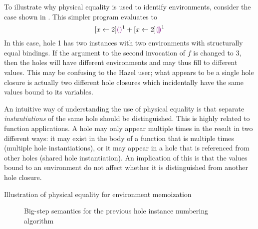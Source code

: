 To illustrate why physical equality is used to identify environments, consider the case shown in . This simpler program evaluates to \[
  [x\leftarrow 2]\textcolor{violet}{\llparenthesis}\textcolor{violet}{\rrparenthesis}^1 + [x\leftarrow 2]\textcolor{violet}{\llparenthesis}\textcolor{violet}{\rrparenthesis}^1
\] In this case, hole 1 has two instances with two environments with structurally equal bindings. If the argument to the second invocation of $f$ is changed to $3$, then the holes will have different environments and may thus fill to different values. This may be confusing to the Hazel user; what appears to be a single hole closure is actually two different hole closures which incidentally have the same values bound to its variables.

An intuitive way of understanding the use of physical equality is that separate \textit{instantiations} of the same hole should be distinguished. This is highly related to function applications. A hole may only appear multiple times in the result in two different ways: it may exist in the body of a function that is multiple times (multiple hole instantiations), or it may appear in a hole that is referenced from other holes (shared hole instantiation). An implication of this is that the values bound to an environment do not affect whether it is distinguished from another hole closure.

\begin{listing}
  \caption{Illustration of physical equality for environment memoization}
  \label{fig:physical-equality-illustration}
\end{listing}


\begin{singlespace}
  \begin{figure}
    \centering
    \begin{subfigure}{\textwidth}
      \begin{mdframed}[bottomline=false]
        
      \end{mdframed}
    \end{subfigure}
  \end{figure}
  \begin{figure}
    \ContinuedFloat
    \begin{subfigure}{\textwidth}
      \begin{mdframed}[topline=false]
        
      \end{mdframed}
    \end{subfigure}
    \caption{Big-step semantics for the previous hole instance numbering algorithm}
    \label{fig:big-step-renumber-old-rules}
  \end{figure}
\end{singlespace}

